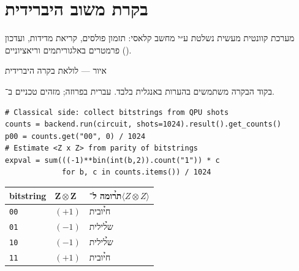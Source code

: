 \chapter{בקרת משוב היברידית}
\label{ch:hybrid}

מערכת קוונטית מעשית נשלטת ע״י מחשב קלאסי: תזמון פולסים, קריאת מדידות,
ועדכון פרמטרים באלגוריתמים וריאציוניים ().

\begin{tikzpic}
\end{tikzpic}
\begin{center}\small איור — לולאת בקרה היברידית\end{center}

\begin{notebox}[frametitle={מוסכמה}]
בקוד הבקרה משתמשים בהערות באנגלית בלבד. עברית בפרוזה; מזהים טכניים ב־.
\end{notebox}

\begin{exbox}[frametitle={דוגמה — שליפת תוצאת מדידה}]
\begin{asmblock}
\begin{lstlisting}[style=cstyle]
# Classical side: collect bitstrings from QPU shots
counts = backend.run(circuit, shots=1024).result().get_counts()
p00 = counts.get("00", 0) / 1024
# Estimate <Z x Z> from parity of bitstrings
expval = sum(((-1)**bin(int(b,2)).count("1")) * c
             for b, c in counts.items()) / 1024
\end{lstlisting}
\end{asmblock}
\end{exbox}

\begin{tablebox}\centering\small
\begin{otherlanguage}{english}
\begin{tabular}{@{}lll@{}}
\toprule
\textbf{bitstring} & $\boldsymbol{Z\otimes Z}$ & \h{תרומה ל־}$\langle Z\otimes Z\rangle$\\
\midrule
\texttt{00} & $(+1)$ & \h{חיובית}\\
\texttt{01} & $(-1)$ & \h{שלילית}\\
\texttt{10} & $(-1)$ & \h{שלילית}\\
\texttt{11} & $(+1)$ & \h{חיובית}\\
\bottomrule
\end{tabular}
\end{otherlanguage}
\end{tablebox}

